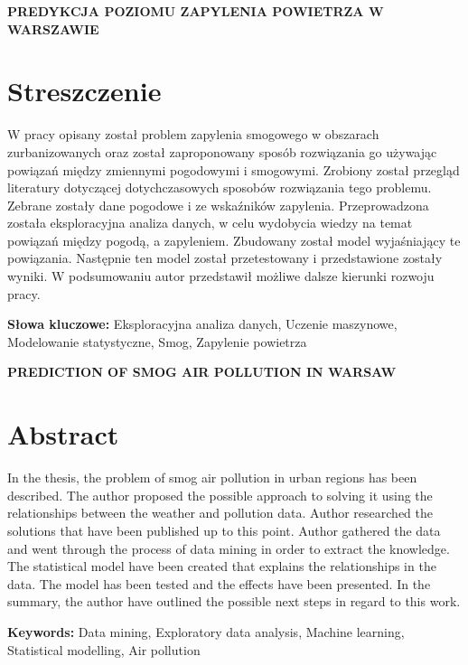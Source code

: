 \newpage
\begin{center}
\large \bf
PREDYKCJA POZIOMU ZAPYLENIA POWIETRZA W WARSZAWIE
\end{center}

\section*{Streszczenie}
W pracy opisany został problem zapylenia smogowego w obszarach zurbanizowanych oraz został zaproponowany sposób rozwiązania go używając powiązań między zmiennymi pogodowymi i smogowymi. Zrobiony został przegląd literatury dotyczącej dotychczasowych sposobów  rozwiązania tego problemu. Zebrane zostały dane pogodowe i ze wskaźników zapylenia. Przeprowadzona została eksploracyjna analiza danych, w celu wydobycia wiedzy na temat powiązań między pogodą, a zapyleniem. Zbudowany został model wyjaśniający te powiązania. Następnie ten model został przetestowany i przedstawione zostały wyniki. W podsumowaniu autor przedstawił możliwe dalsze kierunki rozwoju pracy.

\bigskip
{\noindent\bf Słowa kluczowe:} Eksploracyjna analiza danych, Uczenie maszynowe, Modelowanie statystyczne, Smog, Zapylenie powietrza

\vskip 2cm


\begin{center}
\large \bf
PREDICTION OF SMOG AIR POLLUTION IN WARSAW
\end{center}

\section*{Abstract}
In the thesis, the problem of smog air pollution in urban regions has been described. The author proposed the possible approach to solving it using the relationships between the weather and pollution data. Author researched the solutions that have been published up to this point. Author gathered the data and went through the process of data mining in order to extract the knowledge. The statistical model have been created that explains the relationships in the data. The model has been tested and the effects have been presented. In the summary, the author have outlined the possible next steps in regard to this work.

\bigskip
{\noindent\bf Keywords:} Data mining, Exploratory data analysis, Machine learning, Statistical modelling, Air pollution

\vfill